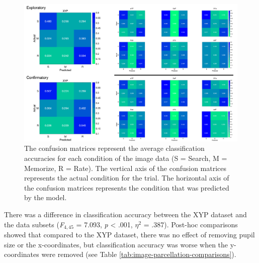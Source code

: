 \documentclass[
  english,
  man, donotrepeattitle,floatsintext]{apa6}
\begin{document}
\begin{figure}
\centering
\includegraphics{figures/img_conf_matrices.pdf}
\caption{\label{fig:img-conf-matrices}The confusion matrices represent the average classification accuracies for each condition of the image data (S = Search, M = Memorize, R = Rate). The vertical axis of the confusion matrices represents the actual condition for the trial. The horizontal axis of the confusion matrices represents the condition that was predicted by the model.}
\end{figure}

There was a difference in classification accuracy between the XYP dataset and the data subsets (\emph{F}\(_{4, 45}\) = 7.093, \emph{p} \textless{} .001, \textit{$\eta$}\(^{2}\) = .387). Post-hoc comparisons showed that compared to the XYP dataset, there was no effect of removing pupil size or the x-coordinates, but classification accuracy was worse when the y-coordinates were removed (see Table \ref{tab:image-parcellation-comparisons}).
\end{document}
